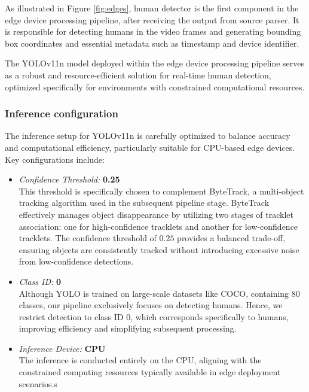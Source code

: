 As illustrated in Figure \ref{fig:edges}, human detector is the first component in the edge device processing pipeline, after receiving the output from source parser. It is responsible for detecting humans in the video frames and generating bounding box coordinates and essential metadata such as timestamp and device identifier.

The YOLOv11n model deployed within the edge device processing pipeline serves as a robust and resource-efficient solution for real-time human detection, optimized specifically for environments with constrained computational resources.

\subsubsection{Inference configuration}

The inference setup for YOLOv11n is carefully optimized to balance accuracy and computational efficiency, particularly suitable for CPU-based edge devices. Key configurations include:

\begin{itemize}
    \item \textit{Confidence Threshold:} \textbf{0.25}\\
    This threshold is specifically chosen to complement ByteTrack, a multi-object tracking algorithm used in the subsequent pipeline stage. ByteTrack effectively manages object disappearance by utilizing two stages of tracklet association: one for high-confidence tracklets and another for low-confidence tracklets. The confidence threshold of $0.25$ provides a balanced trade-off, ensuring objects are consistently tracked without introducing excessive noise from low-confidence detections.


    \item \textit{Class ID:} \textbf{0}\\
    Although YOLO is trained on large-scale datasets like COCO, containing 80 classes, our pipeline exclusively focuses on detecting humans. Hence, we restrict detection to class ID $0$, which corresponds specifically to humans,  improving efficiency and simplifying subsequent processing.

    \item \textit{Inference Device:} \textbf{CPU}\\
    The inference is conducted entirely on the CPU, aligning with the constrained computing resources typically available in edge deployment scenarios.s
\end{itemize}

